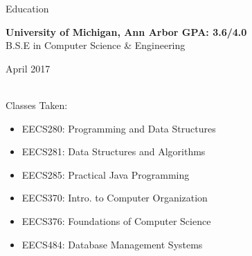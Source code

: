 \documentclass{resume}
\begin{document}

\bigskip


\begin{rSection}{Education}

{\bf University of Michigan, Ann Arbor \hfill GPA: 3.6/4.0 \\}
B.S.E in Computer Science \& Engineering \hfill \begin{em} April 2017 \end{em}\\
Classes Taken:
\vspace{-3mm}
\begin{multicols}{2}
\begin{itemize}[noitemsep,nolistsep]
    \item EECS280: Programming and Data Structures
    \item EECS281: Data Structures and Algorithms
    \item EECS285: Practical Java Programming
    \item EECS370: Intro. to Computer Organization
    \item EECS376: Foundations of Computer Science
    \item EECS484: Database Management Systems
\end{itemize}
\end{multicols}
\vspace{-4mm}

\end{rSection}

\end{document}
